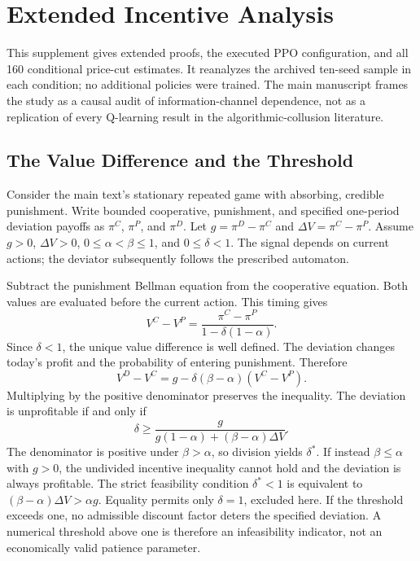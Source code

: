 \documentclass{article}
\begin{document}
\section{Extended Incentive Analysis}

This supplement gives extended proofs, the executed PPO configuration, and all 160 conditional price-cut estimates. It reanalyzes the archived ten-seed sample in each condition; no additional policies were trained. The main manuscript frames the study as a causal audit of information-channel dependence, not as a replication of every Q-learning result in the algorithmic-collusion literature.

\subsection{The Value Difference and the Threshold}

Consider the main text's stationary repeated game with absorbing, credible punishment. Write bounded cooperative, punishment, and specified one-period deviation payoffs as $\pi^C$, $\pi^P$, and $\pi^D$. Let $g = \pi^D - \pi^C$ and $\Delta V = \pi^C - \pi^P$. Assume $g > 0$, $\Delta V > 0$, $0\leq\alpha<\beta\leq1$, and $0\leq\delta<1$. The signal depends on current actions; the deviator subsequently follows the prescribed automaton.

Subtract the punishment Bellman equation from the cooperative equation. Both values are evaluated before the current action. This timing gives
\[
V^C - V^P = \frac{\pi^C - \pi^P}{1 - \delta(1 - \alpha)}.
\]
Since $\delta < 1$, the unique value difference is well defined. The deviation changes today's profit and the probability of entering punishment. Therefore
\[
V^D - V^C = g - \delta(\beta - \alpha)(V^C - V^P).
\]
Multiplying by the positive denominator preserves the inequality. The deviation is unprofitable if and only if
\[
\delta \geq \frac{g}{g(1 - \alpha) + (\beta - \alpha)\Delta V}.
\]
The denominator is positive under $\beta>\alpha$, so division yields $\delta^*$. If instead $\beta\leq\alpha$ with $g>0$, the undivided incentive inequality cannot hold and the deviation is always profitable. The strict feasibility condition $\delta^* < 1$ is equivalent to $(\beta - \alpha)\Delta V > \alpha g$. Equality permits only $\delta = 1$, excluded here. If the threshold exceeds one, no admissible discount factor deters the specified deviation. A numerical threshold above one is therefore an infeasibility indicator, not an economically valid patience parameter.
\end{document}
